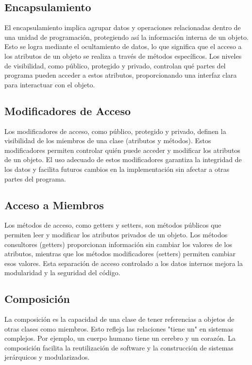\documentclass[11pt, twocolumn]{article}
\begin{document}
  \subsection*{Encapsulamiento}
  El encapsulamiento implica agrupar datos y operaciones relacionadas dentro de una unidad de programación, protegiendo así la información interna de un objeto. Esto se logra mediante el ocultamiento de datos, lo que significa que el acceso a los atributos de un objeto se realiza a través de métodos específicos. Los niveles de visibilidad, como público, protegido y privado, controlan qué partes del programa pueden acceder a estos atributos, proporcionando una interfaz clara para interactuar con el objeto.

  \subsection*{Modificadores de Acceso}
  Los modificadores de acceso, como público, protegido y privado, definen la visibilidad de los miembros de una clase (atributos y métodos). Estos modificadores permiten controlar quién puede acceder y modificar los atributos de un objeto. El uso adecuado de estos modificadores garantiza la integridad de los datos y facilita futuros cambios en la implementación sin afectar a otras partes del programa.

  \subsection*{Acceso a Miembros}
  Los métodos de acceso, como getters y setters, son métodos públicos que permiten leer y modificar los atributos privados de un objeto. Los métodos consultores (getters) proporcionan información sin cambiar los valores de los atributos, mientras que los métodos modificadores (setters) permiten cambiar esos valores. Esta separación de acceso controlado a los datos internos mejora la modularidad y la seguridad del código.

  \subsection*{Composición}
  La composición es la capacidad de una clase de tener referencias a objetos de otras clases como miembros. Esto refleja las relaciones "tiene un" en sistemas complejos. Por ejemplo, un cuerpo humano tiene un cerebro y un corazón. La composición facilita la reutilización de software y la construcción de sistemas jerárquicos y modularizados.
\end{document}
